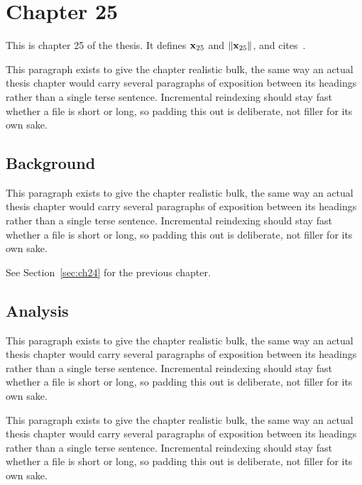 \section{Chapter 25}
\label{sec:ch25}

This is chapter 25 of the thesis. It defines $\mathbf{x}_{25}$ and $\lVert \mathbf{x}_{25} \rVert$, and cites~\cite{ref1}.

This paragraph exists to give the chapter realistic bulk, the same way an actual thesis chapter would carry several paragraphs of exposition between its headings rather than a single terse sentence. Incremental reindexing should stay fast whether a file is short or long, so padding this out is deliberate, not filler for its own sake.

\subsection{Background}
\label{sec:ch25:background}

This paragraph exists to give the chapter realistic bulk, the same way an actual thesis chapter would carry several paragraphs of exposition between its headings rather than a single terse sentence. Incremental reindexing should stay fast whether a file is short or long, so padding this out is deliberate, not filler for its own sake.

See Section~\ref{sec:ch24} for the previous chapter.

\subsection{Analysis}
\label{sec:ch25:analysis}

This paragraph exists to give the chapter realistic bulk, the same way an actual thesis chapter would carry several paragraphs of exposition between its headings rather than a single terse sentence. Incremental reindexing should stay fast whether a file is short or long, so padding this out is deliberate, not filler for its own sake.

This paragraph exists to give the chapter realistic bulk, the same way an actual thesis chapter would carry several paragraphs of exposition between its headings rather than a single terse sentence. Incremental reindexing should stay fast whether a file is short or long, so padding this out is deliberate, not filler for its own sake.

